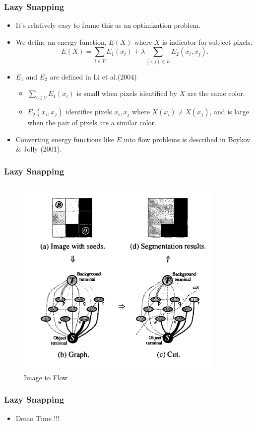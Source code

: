 \documentclass{beamer}
\begin{document}
	\begin{frame}
		\frametitle{Lazy Snapping}
		\begin{itemize}
			\item It's relatively easy to frame this as an optimization problem.
			\item We define an energy function, $E(X)$ where $X$ is indicator for subject pixels. 
			\begin{equation*}
				E(X) = \sum_{i \in V} E_1(x_i) + \lambda \sum_{(i, j) \in E} E_2(x_i, x_j). 
			\end{equation*}
			\item $E_1$ and $E_2$ are defined in Li et al.(2004)
			\begin{itemize}
				\item $\sum_{i \in V} E_1(x_i)$ is small when pixels identified by $X$ are the same color. 
				\item $E_2(x_i, x_j)$ identifies pixels $x_i, x_j$ where $X(x_i) \neq X(x_j)$, and is large when the pair of pixels are a similar color.  
			\end{itemize}
			\item Converting energy functions like $E$ into flow problems is described in Boykov \& Jolly (2001).  
		\end{itemize}
	\end{frame}


	\begin{frame}
		\frametitle{Lazy Snapping}
		\begin{figure}
			\caption{Image to Flow}
			\begin{center}
				\includegraphics[width = .6\textwidth]{image2flow.png}
			\end{center}
			\end{figure}
	\end{frame}

	\begin{frame}
		\frametitle{Lazy Snapping}
		\begin{itemize}
			\item Demo Time !!!
		\end{itemize}
	\end{frame}



\end{document}
